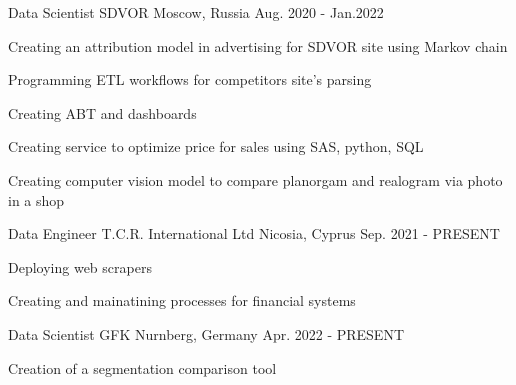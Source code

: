 

\begin{cventries}

  \cventry
    {Data Scientist} %
    {SDVOR} %
    {Moscow, Russia} %
    {Aug. 2020 - Jan.2022} %
    {
      \begin{cvitems} %
        \item {Creating an attribution model in advertising for SDVOR site using Markov chain}
        \item {Programming ETL workflows for competitors site’s parsing}
        \item {Creating ABT and dashboards}
        \item {Creating service to optimize price for sales using SAS, python, SQL}
        \item {Creating computer vision model to compare planorgam and realogram via photo in a shop}
      \end{cvitems}
    }

  \cventry
    {Data Engineer} %
    {T.C.R. International Ltd} %
    {Nicosia, Cyprus} %
    {Sep. 2021 - PRESENT} %
    {
      \begin{cvitems} %
        \item {Deploying web scrapers}
	\item {Creating and mainatining processes for financial systems}
      \end{cvitems}
    }

  \cventry
    {Data Scientist} %
    {GFK} %
    {Nurnberg, Germany} %
    {Apr. 2022 - PRESENT} %
    {
      \begin{cvitems} %
        \item {Creation of a segmentation comparison tool}
      \end{cvitems}
    }
\end{cventries}
